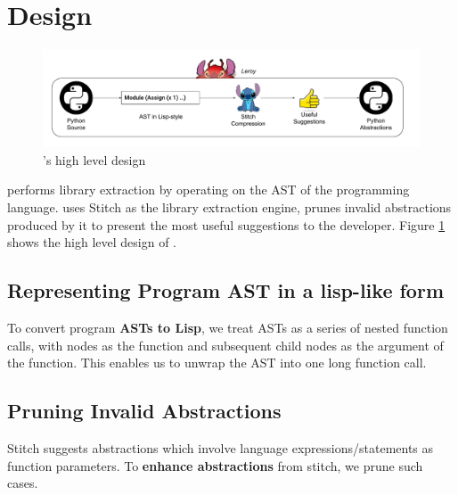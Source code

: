 
\section{Design }


\begin{figure}
  \includegraphics[width=\textwidth]{images/Design.pdf}
  \caption{\toolname's high level design}
  \label{fig:design}
\end{figure}
\toolname performs library extraction by operating on the AST of the programming language. \toolname uses Stitch \cite{Bowers_2023stitch} as the library extraction engine, prunes invalid abstractions produced by it to present the most useful suggestions to the developer. Figure \ref{fig:design} shows the high level design of \toolname.

\subsection{Representing Program AST in a lisp-like form}
To convert program \textbf{ASTs to Lisp}, we treat ASTs as a series of nested function calls, with nodes as the function and subsequent child nodes as the argument of the function. This enables us to unwrap the AST into one long function call.

\subsection{Pruning Invalid Abstractions}
Stitch suggests abstractions which involve language expressions/statements as function parameters. To \textbf{enhance abstractions} from stitch, we prune such cases. 



